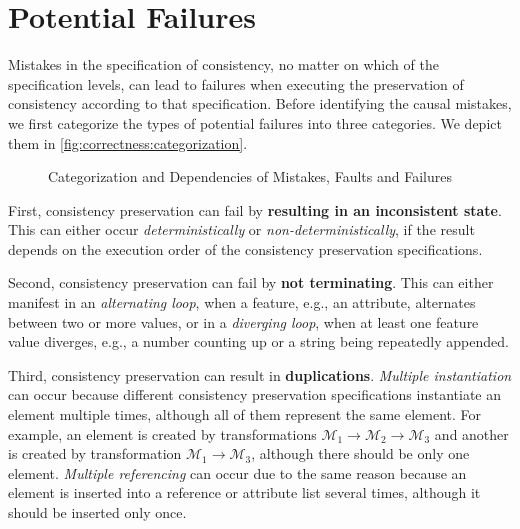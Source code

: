 \section{Potential Failures}
\label{chap:errors:failures}

Mistakes in the specification of consistency, no matter on which of the specification levels, %
can lead to failures when executing the preservation of consistency according to that specification. %
Before identifying the causal mistakes, we first categorize the types of potential failures into three categories. We depict them in \autoref{fig:correctness:categorization}.

\begin{figure}
    \centering
    
    \caption{Categorization and Dependencies of Mistakes, Faults and Failures}
    \label{fig:correctness:categorization}
\end{figure}

First, consistency preservation can fail by \textbf{resulting in an inconsistent state}. This can either occur \emph{deterministically} or \emph{non-deterministically}, if the result depends on the execution order of the consistency preservation specifications.

Second, consistency preservation can fail by \textbf{not terminating}. This can either manifest in an \emph{alternating loop}, when a feature, e.g., an attribute, alternates between two or more values, or in a \emph{diverging loop}, when at least one feature value diverges, e.g., a number counting up or a string being repeatedly appended.

Third, consistency preservation can result in \textbf{duplications}. \emph{Multiple instantiation} can occur because different consistency preservation specifications instantiate an element multiple times, although all of them represent the same element. %
For example, an element is created by transformations $\mathcal{M}_1 \rightarrow \mathcal{M}_2 \rightarrow \mathcal{M}_3$ and another is created by transformation $\mathcal{M}_1 \rightarrow \mathcal{M}_3$, although there should be only one element.
\emph{Multiple referencing} can occur due to the same reason because an element is inserted into a reference or attribute list several times, although it should be inserted only once. 



